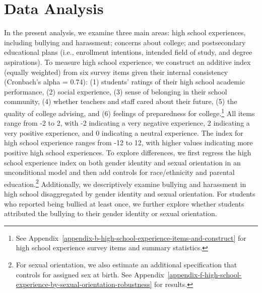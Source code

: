 \section{Data Analysis}\label{data-analysis}

In the present analysis, we examine three main areas: high school
experiences, including bullying and harassment; concerns about college;
and postsecondary educational plans (i.e., enrollment intentions,
intended field of study, and degree aspirations). To measure high school
experience, we construct an additive index (equally weighted) from six
survey items given their internal consistency (Cronbach's alpha = 0.74):
(1) students' ratings of their high school academic performance, (2)
social experience, (3) sense of belonging in their school community, (4)
whether teachers and staff cared about their future, (5) the quality of
college advising, and (6) feelings of preparedness for college.\footnote{See Appendix~\ref{appendix-b-high-school-experience-items-and-construct} for high school experience survey items and summary statistics.} All
items range from -2 to 2, with -2 indicating a very negative experience,
2 indicating a very positive experience, and 0 indicating a neutral
experience. The index for high school experience ranges from -12 to 12,
with higher values indicating more positive high school experiences. To
explore differences, we first regress the high school experience index
on both gender identity and sexual orientation in an unconditional model
and then add controls for race/ethnicity and parental education.\footnote{For sexual orientation, we also estimate an additional specification that controls for assigned sex at birth. See Appendix~\ref{appendix-f-high-school-experience-by-sexual-orientation-robustness} for results.}
Additionally, we descriptively examine bullying and harassment in high
school disaggregated by gender identity and sexual orientation. For
students who reported being bullied at least once, we further explore
whether students attributed the bullying to their gender identity or
sexual orientation.

